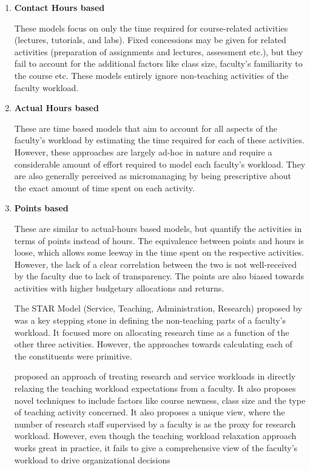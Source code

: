 \begin{enumerate}

\item \textbf{Contact Hours based}

These models focus on only the time required for course-related activities (lectures, tutorials, and labs). Fixed concessions may be given for related activities (preparation of assignments and lectures, assessment etc.), but they fail to account for the additional factors like class size, faculty's familiarity to the course etc. These models entirely ignore non-teaching activities of the faculty workload.

\item \textbf{Actual Hours based}

These are time based models that aim to account for all aspects of the faculty's workload by estimating the time required for each of these activities. However, these approaches are largely ad-hoc in nature and require a considerable amount of effort required to model each faculty's workload. They are also generally perceived as micromanaging by being prescriptive about the exact amount of time spent on each activity.

\item \textbf{Points based}

These are similar to actual-hours based models, but quantify the activities in terms of points instead of hours. The equivalence between points and hours is loose, which allows some leeway in the time spent on the respective activities. However, the lack of a clear correlation between the two is not well-received by the faculty due to lack of transparency. The points are also biased towards activities with higher budgetary allocations and returns.

The STAR Model (Service, Teaching, Administration, Research) proposed by \parencite{finlay1994management} was a key stepping stone in defining the non-teaching parts of a faculty's workload. It focused more on allocating research time as a function of the other three activities. However, the approaches towards calculating each of the constituents were primitive.

\parencite{rohan2017} proposed an approach of treating research and service workloads in directly relaxing the teaching workload expectations from a faculty. It also proposes novel techniques to include factors like course newness, class size and the type of teaching activity concerned. It also proposes a unique view, where the number of research staff supervised by a faculty is as the proxy for research workload. However, even though the teaching workload relaxation approach works great in practice, it fails to give a comprehensive view of the faculty's workload to drive organizational decisions


\end{enumerate}
